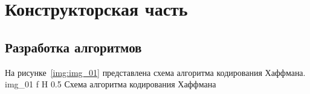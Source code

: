 \chapter{Конструкторская часть}

\section{Разработка алгоритмов}

На рисунке~\ref{img:img_01} представлена схема алгоритма кодирования Хаффмана.
	{img_01}
	{f}
	{H}
	{0.5\textwidth}
	{Схема алгоритма кодирования Хаффмана}
